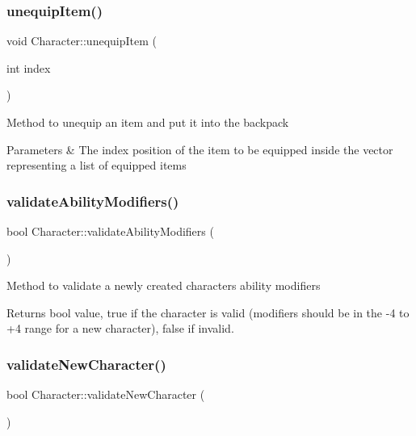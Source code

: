 \subsubsection{\texorpdfstring{unequip\+Item()}{unequipItem()}}
{\footnotesize\ttfamily void Character\+::unequip\+Item (\begin{DoxyParamCaption}\item[{int}]{index }\end{DoxyParamCaption})}

Method to unequip an item and put it into the backpack 
\begin{DoxyParams}{Parameters}
{\em } & The index position of the item to be equipped inside the vector representing a list of equipped items \\
\hline
\end{DoxyParams}
\hypertarget{class_character_ae4953a40791d81dc7cab574aaeca7569}{}\label{class_character_ae4953a40791d81dc7cab574aaeca7569} 
\subsubsection{\texorpdfstring{validate\+Ability\+Modifiers()}{validateAbilityModifiers()}}
{\footnotesize\ttfamily bool Character\+::validate\+Ability\+Modifiers (\begin{DoxyParamCaption}{ }\end{DoxyParamCaption})}

Method to validate a newly created character\textquotesingle{}s ability modifiers \begin{DoxyReturn}{Returns}
bool value, true if the character is valid (modifiers should be in the -\/4 to +4 range for a new character), false if invalid. 
\end{DoxyReturn}
\hypertarget{class_character_adae2bb0e0bb6b8d010be6d1ac3b1fd5f}{}\label{class_character_adae2bb0e0bb6b8d010be6d1ac3b1fd5f} 
\subsubsection{\texorpdfstring{validate\+New\+Character()}{validateNewCharacter()}}
{\footnotesize\ttfamily bool Character\+::validate\+New\+Character (\begin{DoxyParamCaption}{ }\end{DoxyParamCaption})}

